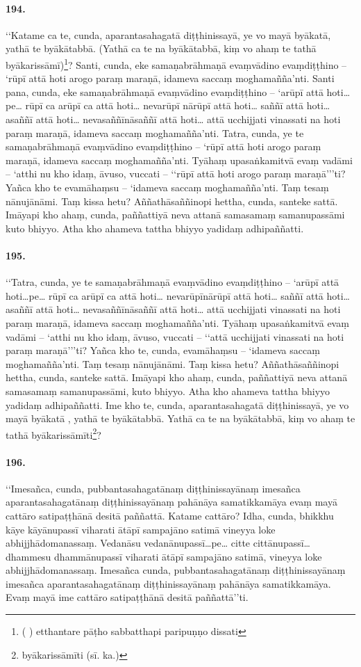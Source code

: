 \paragraph{194.} ‘‘Katame ca te, cunda, aparantasahagatā diṭṭhinissayā, ye vo mayā byākatā, yathā te byākātabbā. (Yathā ca te na byākātabbā, kiṃ vo ahaṃ te tathā byākarissāmī)\footnote{( ) etthantare pāṭho sabbatthapi paripuṇṇo dissati}? Santi, cunda, eke samaṇabrāhmaṇā evaṃvādino evaṃdiṭṭhino – ‘rūpī attā hoti arogo paraṃ maraṇā, idameva saccaṃ moghamañña’nti. Santi pana, cunda, eke samaṇabrāhmaṇā evaṃvādino evaṃdiṭṭhino – ‘arūpī attā hoti…pe… rūpī ca arūpī ca attā hoti… nevarūpī nārūpī attā hoti… saññī attā hoti… asaññī attā hoti… nevasaññīnāsaññī attā hoti… attā ucchijjati vinassati na hoti paraṃ maraṇā, idameva saccaṃ moghamañña’nti. Tatra, cunda, ye te samaṇabrāhmaṇā evaṃvādino evaṃdiṭṭhino – ‘rūpī attā hoti arogo paraṃ maraṇā, idameva saccaṃ moghamañña’nti. Tyāhaṃ upasaṅkamitvā evaṃ vadāmi – ‘atthi nu kho idaṃ, āvuso, vuccati – ‘‘rūpī attā hoti arogo paraṃ maraṇā’’’ti? Yañca kho te evamāhaṃsu – ‘idameva saccaṃ moghamañña’nti. Taṃ tesaṃ nānujānāmi. Taṃ kissa hetu? Aññathāsaññinopi hettha, cunda, santeke sattā. Imāyapi kho ahaṃ, cunda, paññattiyā neva attanā samasamaṃ samanupassāmi kuto bhiyyo. Atha kho ahameva tattha bhiyyo yadidaṃ adhipaññatti.

\paragraph{195.} ‘‘Tatra, cunda, ye te samaṇabrāhmaṇā evaṃvādino evaṃdiṭṭhino – ‘arūpī attā hoti…pe… rūpī ca arūpī ca attā hoti… nevarūpīnārūpī attā hoti… saññī attā hoti… asaññī attā hoti… nevasaññīnāsaññī attā hoti… attā ucchijjati vinassati na hoti paraṃ maraṇā, idameva saccaṃ moghamañña’nti. Tyāhaṃ upasaṅkamitvā evaṃ vadāmi – ‘atthi nu kho idaṃ, āvuso, vuccati – ‘‘attā ucchijjati vinassati na hoti paraṃ maraṇā’’’ti? Yañca kho te, cunda, evamāhaṃsu – ‘idameva saccaṃ moghamañña’nti. Taṃ tesaṃ nānujānāmi. Taṃ kissa hetu? Aññathāsaññinopi hettha, cunda, santeke sattā. Imāyapi kho ahaṃ, cunda, paññattiyā neva attanā samasamaṃ samanupassāmi, kuto bhiyyo. Atha kho ahameva tattha bhiyyo yadidaṃ adhipaññatti. Ime kho te, cunda, aparantasahagatā diṭṭhinissayā, ye vo mayā byākatā , yathā te byākātabbā. Yathā ca te na byākātabbā, kiṃ vo ahaṃ te tathā byākarissāmīti\footnote{byākarissāmīti (sī. ka.)}?

\paragraph{196.} ‘‘Imesañca, cunda, pubbantasahagatānaṃ diṭṭhinissayānaṃ imesañca aparantasahagatānaṃ diṭṭhinissayānaṃ pahānāya samatikkamāya evaṃ mayā cattāro satipaṭṭhānā desitā paññattā. Katame cattāro? Idha, cunda, bhikkhu kāye kāyānupassī viharati ātāpī sampajāno satimā vineyya loke abhijjhādomanassaṃ. Vedanāsu vedanānupassī…pe… citte cittānupassī… dhammesu dhammānupassī viharati ātāpī sampajāno satimā, vineyya loke abhijjhādomanassaṃ. Imesañca cunda, pubbantasahagatānaṃ diṭṭhinissayānaṃ imesañca aparantasahagatānaṃ diṭṭhinissayānaṃ pahānāya samatikkamāya. Evaṃ mayā ime cattāro satipaṭṭhānā desitā paññattā’’ti.


